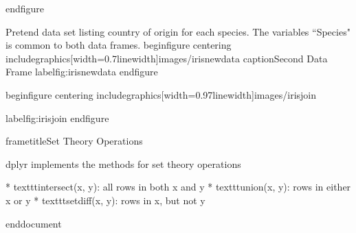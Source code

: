 		end{figure}
		
	
	
		
		Pretend data set listing country of origin for each species.
		The variables ``Species" is common to both data frames.
		begin{figure}
			centering
			includegraphics[width=0.7linewidth]{images/irisnewdata}
			caption{Second Data Frame}
			label{fig:irisnewdata}
		end{figure}
		
	
	
	
		
		begin{figure}
			centering
			includegraphics[width=0.97linewidth]{images/irisjoin}
			
			label{fig:irisjoin}
		end{figure}
		
	
	
	
		frametitle{Set Theory Operations}
		
		dplyr implements the methods for set theory operations
		
		
			         * texttt{intersect(x, y)}: all rows in both x and y
			         * texttt{union(x, y)}: rows in either x or y
			         * texttt{setdiff(x, y)}: rows in x, but not y
		
	
	
	
end{document}

